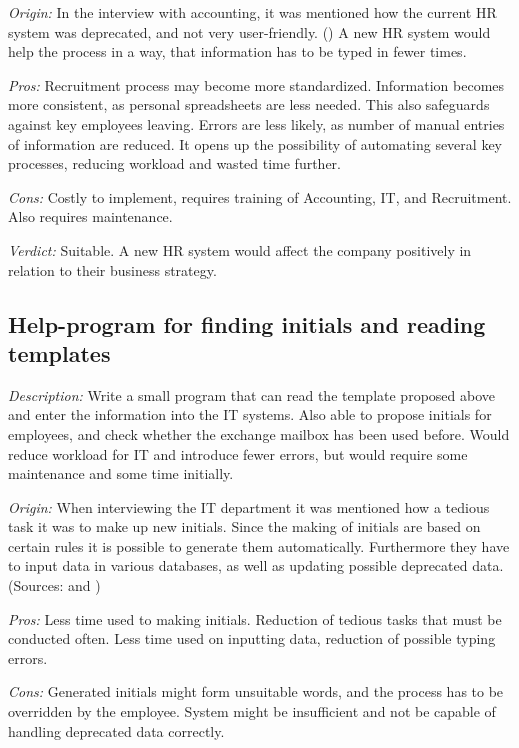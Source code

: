 \emph{Origin:}
In the interview with accounting, it was mentioned how the current HR system was deprecated, and not very user-friendly.
()
A new HR system would help the process in a way, that information has to be typed in fewer times.

 \emph{Pros:} Recruitment process may become more standardized.
Information becomes more consistent, as personal spreadsheets are less needed. 
This also safeguards against key employees leaving.
Errors are less likely, as number of manual entries of information are reduced.
It opens up the possibility of automating several key processes, reducing workload and wasted time further.

 \emph{Cons:} Costly to implement, requires training of Accounting, IT, and Recruitment.
Also requires maintenance.

\emph{Verdict:}
Suitable. A new HR system would affect the company positively in relation to their business strategy.

\subsection{Help-program for finding initials and reading templates}
\emph{Description:} 
Write a small program that can read the template proposed above and enter the information into the IT systems.
Also able to propose initials for employees, and check whether the exchange mailbox has been used before.
Would reduce workload for IT and introduce fewer errors, but would require some maintenance and some time initially.

\emph{Origin:}
When interviewing the IT department it was mentioned how a tedious task it was to make up new initials. Since the making of initials are based on certain rules it is possible to generate them automatically. Furthermore they have to input data in various databases, as well as updating possible deprecated data.
(Sources:  and )

 \emph{Pros:} 
Less time used to making initials. Reduction of tedious tasks that must be conducted often.
Less time used on inputting data, reduction of possible typing errors.

 \emph{Cons:} 
Generated initials might form unsuitable words, and the process has to be overridden by the employee.
System might be insufficient and not be capable of handling deprecated data correctly. 

